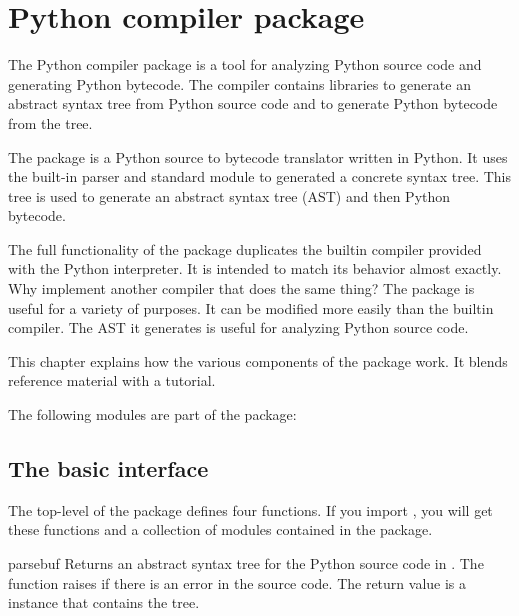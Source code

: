 \chapter{Python compiler package \label{compiler}}



The Python compiler package is a tool for analyzing Python source code
and generating Python bytecode.  The compiler contains libraries to
generate an abstract syntax tree from Python source code and to
generate Python bytecode from the tree.

The  package is a Python source to bytecode
translator written in Python.  It uses the built-in parser and
standard  module to generated a concrete syntax
tree.  This tree is used to generate an abstract syntax tree (AST) and
then Python bytecode.

The full functionality of the package duplicates the builtin compiler
provided with the Python interpreter.  It is intended to match its
behavior almost exactly.  Why implement another compiler that does the
same thing?  The package is useful for a variety of purposes.  It can
be modified more easily than the builtin compiler.  The AST it
generates is useful for analyzing Python source code.

This chapter explains how the various components of the
 package work.  It blends reference material with
a tutorial.

The following modules are part of the  package:

\localmoduletable


\section{The basic interface}


The top-level of the package defines four functions.  If you import
, you will get these functions and a collection of
modules contained in the package.

\begin{funcdesc}{parse}{buf}
Returns an abstract syntax tree for the Python source code in .
The function raises  if there is an error in the
source code.  The return value is a  instance
that contains the tree.  
\end{funcdesc}

